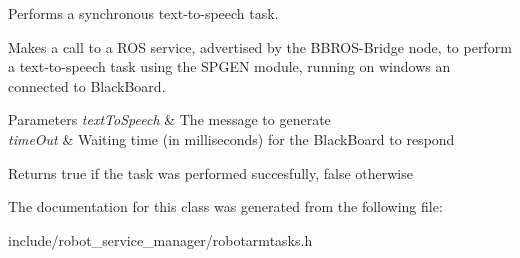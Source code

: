 Performs a synchronous text-\/to-\/speech task. 

Makes a call to a R\+OS service, advertised by the B\+B\+R\+O\+S-\/\+Bridge node, to perform a text-\/to-\/speech task using the S\+P\+G\+EN module, running on windows an connected to Black\+Board.


\begin{DoxyParams}{Parameters}
{\em text\+To\+Speech} & The message to generate \\
\hline
{\em time\+Out} & Waiting time (in milliseconds) for the Black\+Board to respond \\
\hline
\end{DoxyParams}
\begin{DoxyReturn}{Returns}
true if the task was performed succesfully, false otherwise 
\end{DoxyReturn}


The documentation for this class was generated from the following file\+:\begin{DoxyCompactItemize}
\item 
include/robot\+\_\+service\+\_\+manager/robotarmtasks.\+h\end{DoxyCompactItemize}
